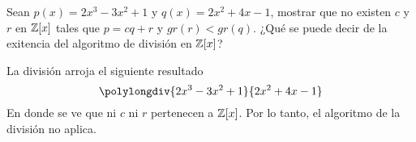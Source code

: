 \item Sean $p(x)=2x^3-3x^2+1$ y $q(x)=2x^2+4x-1$, mostrar que no existen $c$ y $r$ en $\mathbb{Z}[x]$ tales que $p=cq+r$ y $gr(r)<gr(q)$. ¿Qué se puede decir de la exitencia del algoritmo de división en $\mathbb{Z}[x]$?
    \begin{mdframed}[style=s]
        La división arroja el siguiente resultado
        $$\polylongdiv{2x^3-3x^2+1}{2x^2+4x-1}$$
        En donde se ve que ni $c$ ni $r$ pertenecen a $\mathbb{Z}[x]$. Por lo tanto, el algoritmo de la división no aplica.
    \end{mdframed}
